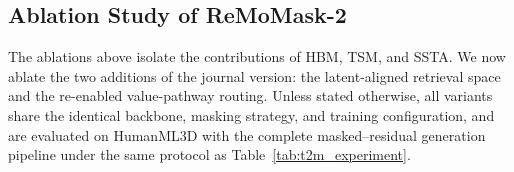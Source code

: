 \subsection{Ablation Study of ReMoMask-2}
\label{subsec:ablation_v2}
The ablations above isolate the contributions of HBM, TSM, and SSTA. We now ablate the two additions of the journal version: the latent-aligned retrieval space and the re-enabled value-pathway routing.
Unless stated otherwise, all variants share the identical backbone, masking strategy, and training configuration, and are evaluated on HumanML3D with the complete masked--residual generation pipeline under the same protocol as Table~\ref{tab:t2m_experiment}.

